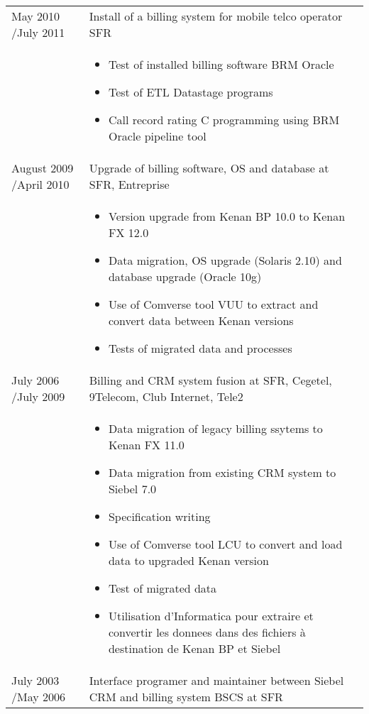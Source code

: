 \documentclass[a4paper,11pt]{letter}
\begin{document}
\begin{tabular}{p{}p{}}
May 2010 \slash July 2011 & Install of a billing system for mobile telco operator SFR \\
	

& \begin{itemize}
\item Test of installed billing software BRM Oracle
\item Test of ETL Datastage programs
\item Call record rating C programming using BRM Oracle pipeline tool
\end{itemize} \\
	
August 2009 \slash April 2010 & Upgrade of billing software, OS and database at SFR, Entreprise\\

& \begin{itemize}
\item        Version upgrade from Kenan BP 10.0 to Kenan FX 12.0
\item        Data migration, OS upgrade (Solaris 2.10) and database upgrade (Oracle 10g)
\item        Use of Comverse tool VUU to extract and convert data between Kenan versions
\item        Tests of migrated data and processes
\end{itemize} \\


July 2006 \slash July 2009 & Billing and CRM system fusion at SFR, Cegetel, 9Telecom, Club Internet, Tele2 \\
	
& \begin{itemize}
\item         Data migration of legacy billing ssytems to Kenan FX 11.0
\item         Data migration from existing CRM system to Siebel 7.0
\item         Specification writing
\item         Use of Comverse tool LCU to convert and load data to upgraded Kenan version
\item         Test of migrated data
\item         Utilisation d'Informatica pour extraire et convertir les donnees dans des fichiers à destination de Kenan BP et Siebel
\end{itemize} \\

	

July 2003 \slash May 2006 & Interface programer and maintainer between Siebel CRM and billing system BSCS at SFR \\
	


\end{tabular}
\end{document}
